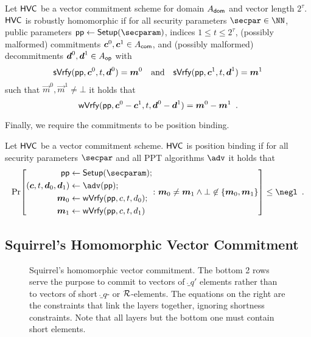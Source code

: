 \begin{definition} \label{def:malhomhvc}
  Let $\mathsf{HVC}$ be a vector commitment scheme for domain $A_{\mathsf{dom}}$ and vector length $2^\tau$.
  $\mathsf{HVC}$ is robustly homomorphic if for all security parameters $\secpar\in\NN$, public parameters $\params\gets\setup(\secparam)$, indices $1\leq t \leq 2^\tau$, (possibly malformed) commitments $\boldsymbol{c}^0,\boldsymbol{c}^1 \in A_{\mathsf{com}}$, and (possibly malformed) decommitments $\boldsymbol{d}^0,\boldsymbol{d}^1\in A_{\mathsf{op}}$ with
  \[
    \mathsf{sVrfy}(\mathsf{pp},\boldsymbol{c}^0, t,\boldsymbol{d}^0)=\boldsymbol{m}^0 \quad \text{and} \quad \mathsf{sVrfy}(\mathsf{pp},\boldsymbol{c}^1, t,\boldsymbol{d}^1)=\boldsymbol{m}^1
  \]
  such that $\vec{m}^0,\vec{m}^1\neq \bot$ it holds that
  \[
    \mathsf{wVrfy}(\mathsf{pp},\boldsymbol{c}^0 - \boldsymbol{c}^1, t,\boldsymbol{d}^0 - \boldsymbol{d}^1)=\boldsymbol{m}^0 - \boldsymbol{m}^1\enspace.
  \]
\end{definition}
%
Finally, we require the commitments to be position binding.
\begin{definition}\label{def:position_binding}
  Let $\mathsf{HVC}$ be a vector commitment scheme.
  $\mathsf{HVC}$ is position binding if for all security parameters $\secpar$ and all PPT algorithms $\adv$ it holds that
  \[
    \Pr\mleft[
      \begin{aligned}
      \params\gets{}&\setup(\secparam);\\
      (\vec{c},t,\vec{d}_0,\vec{d}_1) \gets{}& \adv(\params);\\
      \vec{m}_0 \gets{}& \wverify(\params,c,t,d_0);\\
      \vec{m}_1 \gets{}& \wverify(\params,c,t,d_1)
      \end{aligned}\colon
      \vec{m}_0\neq \vec{m}_1 \land \bot\not\in\{\vec{m}_0,\vec{m}_1\}
    \mright]\leq \negl\enspace.
  \]
\end{definition}

\subsection{Squirrel's Homomorphic Vector Commitment}\label{subsec:squirrelrecap}

\begin{figure}
\centering

\caption{Squirrel's homomorphic vector commitment. The bottom 2 rows serve the purpose to commit to vectors of $\ring_{q'}$ elements rather than to vectors of short $\ring_q$- or $\mathcal{R}$-elements. The equations on the right are the constraints that link the layers together, ignoring shortness constraints. Note that all layers but the bottom one must contain short elements.}\label{fig:squirreltree}
\end{figure}

